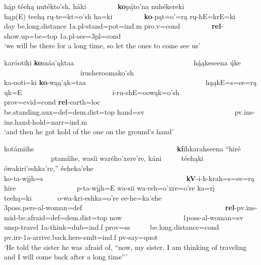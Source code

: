 \begin{exe}
\begin{xlist}
	\item \glll hą́p téehą nutékto'sh, háki ~ ~ ~ ~ ~ \textbf{ko}pą́to'na nuhékereki\\
	hąp(E) teehą rų-te=kt=o'sh ha=ki ~ ~ ~ ~ ~  \textbf{ko}-pąt=o'=rą rų-hE=krE=ki\\
	\textnormal{day} \textnormal{be.long.distance} 1a.pl-\textnormal{stand}=pot=ind.m pro.v=cond ~ ~ ~ ~ ~  \textbf{rel}-\textnormal{show.up}=\textnormal{be}=top 1a.pl-\textnormal{see}=3pl=cond\\
	\glt `we will be there for a long time, so let the ones to come see us' \citep[206]{hollow1973b}
	

	
	\item \glll karóotiki \textbf{ko}máa'ąktaa ~ ~ ~ ~ ~ ~ ~ ~ ~ ~ ~ ~ ~ ~ ~ ~ ~ ~ ~ ~ hą́ąkeseena ų́ke ~ ~ ~ ~ ~ ~ ~ ~ ~ ~ ~ ~ ~ ~ ~ írusheroomako'sh\\
		ka-ooti=ki \textbf{ko}-wąą'ąk=taa ~ ~ ~ ~ ~ ~ ~ ~ ~ ~ ~ ~ ~ ~ ~ ~ ~ ~ ~ ~ hąąkE=s=ee=rą ųk=E ~ ~ ~ ~ ~ ~ ~ ~ ~ ~ ~ ~ ~ ~ ~ i-ru-shE=oowąk=o'sh\\
		prov=evid=cond \textbf{rel}-\textnormal{earth}=loc ~ ~ ~ ~ ~ ~ ~ ~ ~ ~ ~ ~ ~ ~ ~ ~ ~ ~ ~ ~ \textnormal{be.standing}.aux=def=dem.dist=top \textnormal{hand}=sv ~ ~ ~ ~ ~ ~ ~ ~ ~ ~ ~ ~ ~ ~ ~ pv.ins-ins.hand-\textnormal{hold}=narr=ind.m\\
		\glt `and then he got hold of the one on the ground's hand' \citep[273]{hollow1973b}
		
	\item\label{relg} \glll kotámiihs ~ ~ ~ ~ ~ ~ ~ ~ ~ ~ ~ ~ ~ ~ ~ ~ ~ ~ ~ ~ ~ ~ ~ ~ \textbf{kí}ihkarahseena ``hiré ~ ~ ~ ~ ~ ~ ~ ~ ~ ~ ptamíihe, wasíi warého'xere're, káni ~ ~ ~ téehąki ~ ~ ~ ~  ówakiri'eshka're,'' éeheka'ehe\\
	ko-ta-wįįh=s ~ ~ ~ ~ ~ ~ ~ ~ ~ ~ ~ ~ ~ ~ ~ ~ ~ ~ ~ ~ ~ ~ ~ ~ \textbf{kV}-i-k-krah=s=ee=rą hire ~ ~ ~ ~ ~ ~ ~ ~ ~ ~ p-ta-wįįh=E wa-sii wa-reh=o'xre=o're ka=rį ~ ~ ~ teehą=ki ~ ~ ~ ~ o-wa-kri-eshka=o're ee-he=ka'ehe\\
	3poss.pers-al-\textnormal{woman}=def ~ ~ ~ ~ ~ ~ ~ ~ ~ ~ ~ ~ ~ ~ ~ ~ ~ ~ ~ ~ ~ ~ ~ ~ \textbf{rel}-pv.ins-mid-\textnormal{be.afraid}=def=dem.dist=top \textnormal{now} ~ ~ ~ ~ ~ ~ ~ ~ ~ ~ 1poss-al-\textnormal{woman}=sv unsp-\textnormal{travel} 1a-\textnormal{think}=dub=ind.f prov=ss ~ ~ ~ \textnormal{be.long.distance}=cond ~ ~ ~ ~  pv.irr-1a-\textnormal{arrive.back.here}-smlt=ind.f pv-\textnormal{say}=quot\\
	\glt 	`He told the sister he was afraid of, ``now, my sister, I am thinking of traveling and I will come back after a long time''' \citep[281]{hollow1973b}
	

\end{xlist}
\end{exe}

